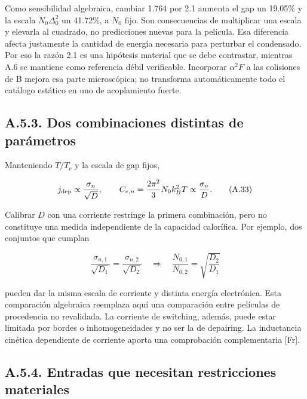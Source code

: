 \documentclass[
  spanish,
  10pt,
  a4paper,
]{article}
\begin{document}
Como sensibilidad algebraica, cambiar 1.764 por 2.1 aumenta el gap un
19.05\% y la escala \(N_0\Delta_0^2\) un 41.72\%, a \(N_0\) fijo. Son
consecuencias de multiplicar una escala y elevarla al cuadrado, no
predicciones nuevas para la película. Esa diferencia afecta justamente
la cantidad de energía necesaria para perturbar el condensado. Por eso
la razón 2.1 es una hipótesis material que se debe contrastar, mientras
A.6 se mantiene como referencia débil verificable. Incorporar
\(\alpha^2F\) a las colisiones de B mejora esa parte microscópica; no
transforma automáticamente todo el catálogo estático en uno de
acoplamiento fuerte.

\subsection{A.5.3. Dos combinaciones distintas de
parámetros}\label{a.5.3.-dos-combinaciones-distintas-de-paruxe1metros}

Manteniendo \(T/T_c\) y la escala de gap fijos,

\[
j_{\rm dep}\propto\frac{\sigma_n}{\sqrt D},
\qquad C_{e,n}=\frac{2\pi^2}{3}N_0k_B^2T
\propto\frac{\sigma_n}{D}.
\tag{A.33}
\]

Calibrar \(D\) con una corriente restringe la primera combinación, pero
no constituye una medida independiente de la capacidad calorífica. Por
ejemplo, dos conjuntos que cumplan

\[
\frac{\sigma_{n,1}}{\sqrt{D_1}}
=\frac{\sigma_{n,2}}{\sqrt{D_2}}
\quad\Longrightarrow\quad
\frac{N_{0,1}}{N_{0,2}}=\sqrt{\frac{D_2}{D_1}}
\tag{A.34}
\]

pueden dar la misma escala de corriente y distinta energía electrónica.
Esta comparación algebraica reemplaza aquí una comparación entre
películas de procedencia no revalidada. La corriente de switching,
además, puede estar limitada por bordes o inhomogeneidades y no ser la
de depairing. La inductancia cinética dependiente de corriente aporta
una comprobación complementaria {[}Fr{]}.

\subsection{A.5.4. Entradas que necesitan restricciones
materiales}\label{a.5.4.-entradas-que-necesitan-restricciones-materiales}
\end{document}
